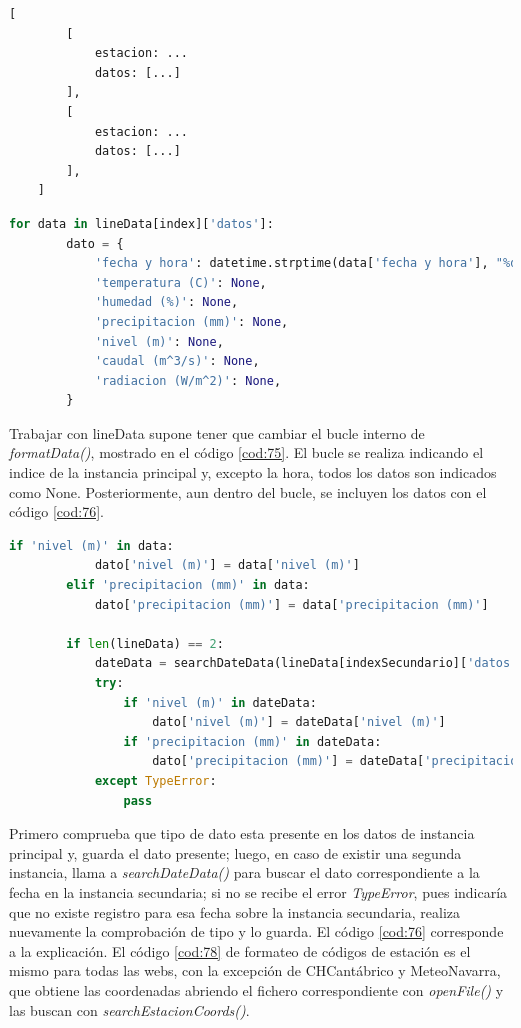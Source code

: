 \begin{lstlisting}[language=Python, caption={Formato del diccionario lineData en caso de disponer de dos instancias de una misma estación}, label=cod:74]
	[
		[
			estacion: ...
			datos: [...]
		],
		[
			estacion: ...
			datos: [...]
		],
	]
\end{lstlisting}

\begin{lstlisting}[language=Python, caption={Modificación del bucle interno de \textit{formatData()}}, label=cod:75]
	for data in lineData[index]['datos']:
		dato = {
			'fecha y hora': datetime.strptime(data['fecha y hora'], "%d/%m/%Y %H:%M:%S").strftime("%Y-%m-%d %H:%M"),
			'temperatura (C)': None,
			'humedad (%)': None,
			'precipitacion (mm)': None,
			'nivel (m)': None,
			'caudal (m^3/s)': None,
			'radiacion (W/m^2)': None,
		}
\end{lstlisting}

Trabajar con lineData supone tener que cambiar el bucle interno de \textit{formatData()}, mostrado en el código \ref{cod:75}. El bucle se realiza indicando el indice de la instancia principal y, excepto la hora, todos los datos son indicados como None. Posteriormente, aun dentro del bucle, se incluyen los datos con el código \ref{cod:76}.

\begin{lstlisting}[language=Python, caption={Inclusion de los datos en el objeto JSON dato}, label=cod:76]
		if 'nivel (m)' in data:
			dato['nivel (m)'] = data['nivel (m)']
		elif 'precipitacion (mm)' in data:
			dato['precipitacion (mm)'] = data['precipitacion (mm)']
		
		if len(lineData) == 2:
			dateData = searchDateData(lineData[indexSecundario]['datos'], data['fecha y hora'])
			try:
				if 'nivel (m)' in dateData:
					dato['nivel (m)'] = dateData['nivel (m)']
				if 'precipitacion (mm)' in dateData:
					dato['precipitacion (mm)'] = dateData['precipitacion (mm)']
			except TypeError:
				pass
\end{lstlisting}

Primero comprueba que tipo de dato esta presente en los datos de instancia principal y, guarda el dato presente; luego, en caso de existir una segunda instancia, llama a \textit{searchDateData()} para buscar el dato correspondiente a la fecha en la instancia secundaria; si no se recibe el error \textit{TypeError}, pues indicaría que no existe registro para esa fecha sobre la instancia secundaria, realiza nuevamente la comprobación de tipo y lo guarda. El código \ref{cod:76} corresponde a la explicación.\newline
\newline
El código \ref{cod:78} de formateo de códigos de estación es el mismo para todas las webs, con la excepción de CHCantábrico y MeteoNavarra, que obtiene las coordenadas abriendo el fichero correspondiente con \textit{openFile()} y las buscan con \textit{searchEstacionCoords()}.

